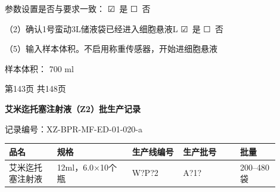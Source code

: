 \documentclass[UTF8,10pt,a4paper,fontset=fandol]{ctexart}
\newcommand{\fieldvalue}[1]{#1}
\newcommand{\handwritten}[1]{#1}
\newcommand{\checkboxfield}[1]{\ifstrequal{#1}{checked}{☑}{\ifstrequal{#1}{unclear}{?}{☐}}}
\begin{document}
\begin{flushright}
参数设置是否与要求一致：
\fieldvalue{\handwritten{\checkboxfield{checked}}}\ 是
\quad
\fieldvalue{\checkboxfield{unchecked}}\ 否
\end{flushright}

\vspace{0.5em}

（2）确认1号蛮动3L储液袋已经进入细胞悬液L
\fieldvalue{\handwritten{\checkboxfield{checked}}}\ 是
\quad
\fieldvalue{\checkboxfield{unchecked}}\ 否

\vspace{0.5em}

（5）输入样本体积。不启用称重传感器，开始进细胞悬液

\noindent
样本体积：
\fieldvalue{\handwritten{700}} ml

\vfill

\begin{center}
第143页 共148页
\end{center}

\newpage

\begin{center}
\textbf{艾米迄托塞注射液（Z2）批生产记录}
\end{center}

记录编号：XZ-BPR-MF-ED-01-020-a

\begin{tabular}{|p{0.16\linewidth}|p{0.25\linewidth}|p{0.17\linewidth}|p{0.19\linewidth}|p{0.13\linewidth}|}
\hline
品名 & 规格 & 生产线编号 & 生产批号 & 批量 \\ \hline
\fieldvalue{艾米迄托塞注射液} &
\fieldvalue{12ml，6.0$\times$10个瓶} &
\fieldvalue{\handwritten{W?P?2}} &
\fieldvalue{\handwritten{A?1?}} &
\fieldvalue{200--480袋}
\\ \hline
\end{tabular}
\end{document}
